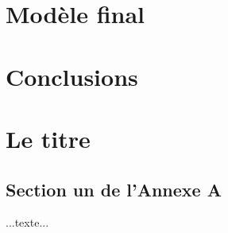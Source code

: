 \documentclass[12pt,twoside,maitrise]{dms}
\theoremstyle{definition}
\numberwithin{equation}{section}
\numberwithin{table}{chapter}
\numberwithin{figure}{chapter}
\begin{document}
\chapter{Modèle final}
\chapter{Conclusions}




\def\bibname{R\'ef\'erences} %


\appendix
\chapter{Le titre}

\section{Section un de l'Annexe A}

...texte...
\end{document}
